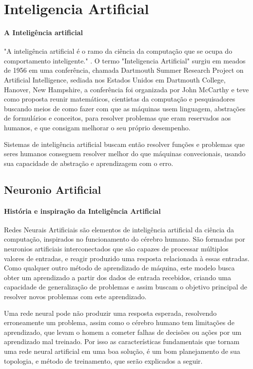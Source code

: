 \documentclass[	12pt, Times, openright, twoside, a4paper, english, brazil]{abntex2}
\begin{document}
      \section{Inteligencia Artificial}
        \paragraph*{A Inteligência artificial} "A inteligência artificial é o ramo da ciência da computação que se ocupa do comportamento inteligente." \cite{Luger2004}.
          O termo "Inteligencia Artificial" surgiu em meados de 1956 em uma conferência, chamada Dartmouth Summer Research Project on Artificial Intelligence, sediada nos Estados Unidos em Dartmouth College, Hanover, New Hampshire, a conferência foi organizada por John McCarthy e teve como proposta reunir matemáticos, cientistas da computação e pesquisadores buscando meios de como fazer com que as máquinas usem linguagem, abstrações de formulários e conceitos, para resolver problemas que eram reservados aos humanos, e que consigam melhorar o seu próprio desempenho.

          Sistemas de inteligência artificial buscam então resolver funções e problemas que seres humanos conseguem resolver melhor do que máquinas convecionais, usando sua capacidade de abstração e aprendizagem com o erro.

        \subsection{Neuronio Artificial}
         
          \paragraph*{História e inspiração da Inteligência Artificial}
            Redes Neurais Artificiais são elementos de inteligência artificial da ciência da computação, inspirados no funcionamento do cérebro humano.
            São formadas por neuronios artificiais interconectados que são capazes de processar múltiplos valores de entradas, e reagir produzido uma resposta relacionada à essas entradas.
            Como qualquer outro método de aprendizado de máquina, este modelo busca obter um aprendizado a partir dos dados de entrada recebidos, criando uma capacidade de generalização de problemas e assim buscam o objetivo principal de resolver novos problemas com este aprendizado.

            Uma rede neural pode não produzir uma resposta esperada, resolvendo erroneamente um problema, assim como o cérebro humano tem limitações de aprendizado, que levam o homem a cometer falhas de decisões ou ações por um aprendizado mal treinado. Por isso as características fundamentais que tornam uma rede neural artificial em uma boa solução, é um bom planejamento de sua topologia, e método de treinamento, que serão explicados a seguir.
\end{document}
